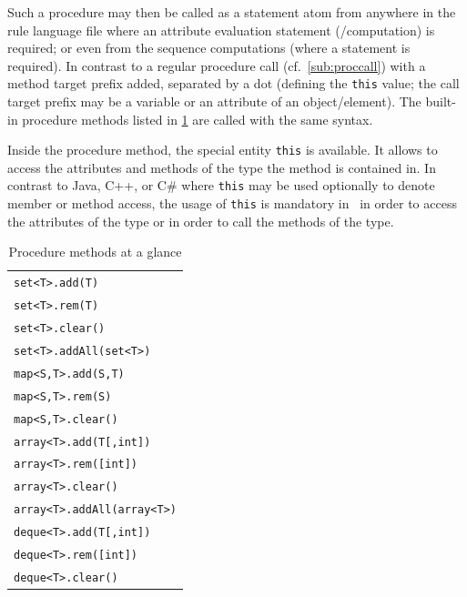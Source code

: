 Such a procedure may then be called as a statement atom from anywhere in the rule language file where an attribute evaluation statement (/computation) is required; or even from the sequence computations (where a statement is required).
In contrast to a regular procedure call (cf.~\ref{sub:proccall}) with a method target prefix added, separated by a dot (defining the \texttt{this} value; the call target prefix may be a variable or an attribute of an object/element).
The built-in procedure methods listed in \ref{procmethstab} are called with the same syntax.

Inside the procedure method, the special entity \texttt{this} is available.
It allows to access the attributes and methods of the type the method is contained in.
In contrast to Java, C++, or C\# where \texttt{this} may be used optionally to denote member or method access,
the usage of \texttt{this} is mandatory in \GrG~in order to access the attributes of the type or in order to call the methods of the type.


\begin{table}[htbp]
\centering
\begin{tabular}{|l|}
\hline
\texttt{set<T>.add(T)}\\
\texttt{set<T>.rem(T)}\\
\texttt{set<T>.clear()}\\
\texttt{set<T>.addAll(set<T>)}\\
\hline
\texttt{map<S,T>.add(S,T)}\\
\texttt{map<S,T>.rem(S)}\\
\texttt{map<S,T>.clear()}\\
\hline
\texttt{array<T>.add(T[,int])}\\
\texttt{array<T>.rem([int])}\\
\texttt{array<T>.clear()}\\
\texttt{array<T>.addAll(array<T>)}\\
\hline
\texttt{deque<T>.add(T[,int])}\\
\texttt{deque<T>.rem([int])}\\
\texttt{deque<T>.clear()}\\
\hline
\end{tabular}
\caption{Procedure methods at a glance}
\label{procmethstab}
\end{table}



